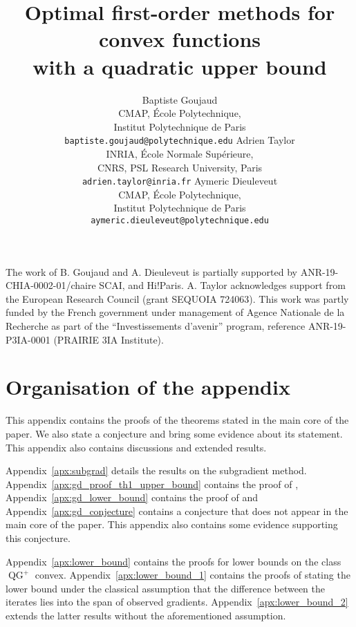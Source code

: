 \documentclass{article}
\title{Optimal first-order methods for convex functions \\ with a quadratic upper bound}
\author{
    Baptiste Goujaud\\
    CMAP, École Polytechnique, \\ Institut Polytechnique de Paris \\
    \texttt{baptiste.goujaud@polytechnique.edu}
    \And
    Adrien Taylor \\
    INRIA, École Normale Supérieure, \\ CNRS, PSL Research University, Paris \\
    \texttt{adrien.taylor@inria.fr}
    \And
    Aymeric Dieuleveut \\
    CMAP, École Polytechnique, \\ Institut Polytechnique de Paris \\ \texttt{aymeric.dieuleveut@polytechnique.edu}
}
\def\QG{\operatorname{QG}}
\begin{document}

\maketitle




\begin{ack}
    The work of B. Goujaud and A. Dieuleveut is partially supported by ANR-19-CHIA-0002-01/chaire SCAI, and Hi!Paris.
    A. Taylor acknowledges support from the European Research Council (grant SEQUOIA 724063).
    This work was partly funded by the French government under management
    of Agence Nationale de la Recherche as part of the ``Investissements d’avenir'' program,
    reference ANR-19-P3IA-0001 (PRAIRIE 3IA Institute).
\end{ack}




\clearpage
\appendix

    \section*{Organisation of the appendix}
    
        This appendix contains the proofs of the theorems stated in the main core of the paper.
        We also state a conjecture and bring some evidence about its statement.
        This appendix also contains discussions and extended results.
        
        Appendix~\ref{apx:subgrad} details the results on the subgradient method.
        Appendix~\ref{apx:gd_proof_th1_upper_bound} contains the proof of ,
        Appendix~\ref{apx:gd_lower_bound} contains the proof of 
        and Appendix~\ref{apx:gd_conjecture} contains a conjecture that does not appear in the main core of the paper.
        This appendix also contains some evidence supporting this conjecture.
        
        Appendix~\ref{apx:lower_bound} contains the proofs for lower bounds on the class $\QG^+$ convex.
        Appendix~\ref{apx:lower_bound_1} contains the proofs of 
        stating the lower bound under the classical assumption
        that the difference between the iterates lies into the span of observed gradients.
        Appendix~\ref{apx:lower_bound_2} extends the latter results without the aforementioned assumption.
        
\end{document}
